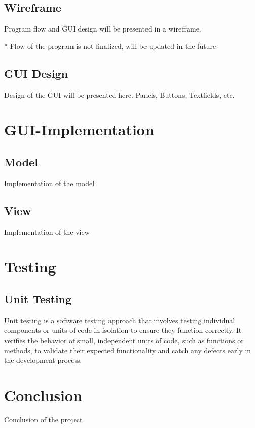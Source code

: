 \section{Wireframe}
Program flow and GUI design will be presented in a wireframe.

* Flow of the program is not finalized, will be updated in the future

\section{GUI Design}
Design of the GUI will be presented here. Panels, Buttons, Textfields, etc.

\chapter{GUI-Implementation}
\section{Model}
Implementation of the model
\section{View}
Implementation of the view

\chapter{Testing}
\section{Unit Testing}
Unit testing is a software testing approach that involves testing individual components or units of code in isolation to ensure they function correctly. It verifies the behavior of small, independent units of code, such as functions or methods, to validate their expected functionality and catch any defects early in the development process. \cite{Hamilton23}

\chapter{Conclusion}
Conclusion of the project
